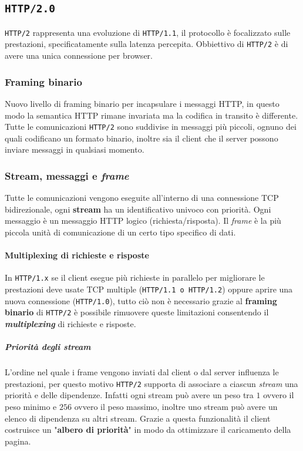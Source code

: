     \subsection[\texttt{HTTP/2.0}]{\texttt{\Acrshort*{HTTP}/2.0}}
        \texttt{\Acrshort*{HTTP}/2} rappresenta una evoluzione di \texttt{\Acrshort*{HTTP}/1.1}, il protocollo è focalizzato sulle prestazioni, specificatamente sulla latenza percepita. Obbiettivo di \texttt{\Acrshort*{HTTP}/2} è di avere una unica connessione per browser.
        \subsubsection{Framing binario}
            Nuovo livello di framing binario per incapsulare i messaggi \Acrshort*{HTTP}, in questo modo la semantica \Acrshort*{HTTP} rimane invariata ma la codifica in transito è differente. Tutte le comunicazioni \texttt{\Acrshort*{HTTP}/2} sono suddivise in messaggi più piccoli, ognuno dei quali codificano un formato binario, inoltre sia il client che il server possono inviare messaggi in qualsiasi momento.
        \subsubsection{Stream, messaggi e \textit{frame}}
            Tutte le comunicazioni vengono eseguite all'interno di una connessione \Acrshort*{TCP} bidirezionale, ogni \textbf{stream} ha un identificativo univoco con priorità. Ogni messaggio è un messaggio \Acrshort*{HTTP} logico (richiesta/risposta). Il \textit{frame} è la più piccola unità di comunicazione di un certo tipo specifico di dati.
            \paragraph{Multiplexing di richieste e risposte}
                In \texttt{\Acrshort*{HTTP}/1.x} se il client esegue più richieste in parallelo per migliorare le prestazioni deve usate \Acrshort*{TCP} multiple (\texttt{\Acrshort*{HTTP}/1.1 o \Acrshort*{HTTP}/1.2}) oppure aprire una nuova connessione (\texttt{\Acrshort*{HTTP}/1.0}), tutto ciò non è necessario grazie al \textbf{framing binario} di \texttt{\Acrshort*{HTTP}/2} è possibile rimuovere queste limitazioni consentendo il \textit{\textbf{multiplexing}} di richieste e risposte.
                \subparagraph{Priorità degli stream} L'ordine nel quale i frame vengono inviati dal client o dal server influenza le prestazioni, per questo motivo \texttt{\Acrshort*{HTTP}/2} supporta di associare a ciascun \textit{stream} una priorità e delle dipendenze. Infatti ogni stream può avere un peso tra $ 1 $ ovvero il peso minimo e $ 256 $ ovvero il peso massimo, inoltre uno stream può avere un elenco di dipendenza su altri stream. Grazie a questa funzionalità il client costruisce un "\textbf{albero di priorità}" in modo da ottimizzare il caricamento della pagina.
